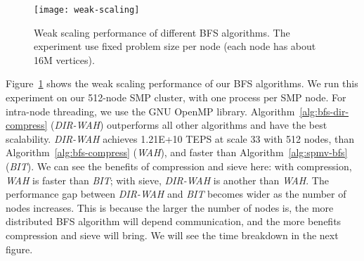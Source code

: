\documentclass[conference]{IEEEtran}
\begin{document}
\begin{figure}[t]
  \centering
  \texttt{[image: weak-scaling]}
  \caption{Weak scaling performance of different BFS algorithms. The
    experiment use fixed problem size per node (each node has about 16M
    vertices).}
  \label{fig:weak-scaling}
\end{figure}
Figure~\ref{fig:weak-scaling} shows the weak scaling performance of our BFS
algorithms. We run this experiment on our 512-node SMP cluster, with one
process per SMP node. For intra-node threading, we use the GNU OpenMP library.
Algorithm~\ref{alg:bfs-dir-compress} (\textit{DIR-WAH}) outperforms all other
algorithms and have the best scalability.  \textit{DIR-WAH} achieves 1.21E+10
TEPS at scale 33 with 512 nodes,  than
Algorithm~\ref{alg:bfs-compress} (\textit{WAH}), and  faster than
Algorithm~\ref{alg:spmv-bfs} (\textit{BIT}). We can see the benefits of
compression and sieve here: with compression, \textit{WAH} is 
faster than \textit{BIT}; with sieve, \textit{DIR-WAH} is another 
than \textit{WAH}. The performance gap between \textit{DIR-WAH} and
\textit{BIT} becomes wider as the number of nodes increases. This is because
the larger the number of nodes is, the more distributed BFS algorithm will
depend communication, and the more benefits compression and sieve will
bring. We will see the time breakdown in the next figure.
\end{document}
